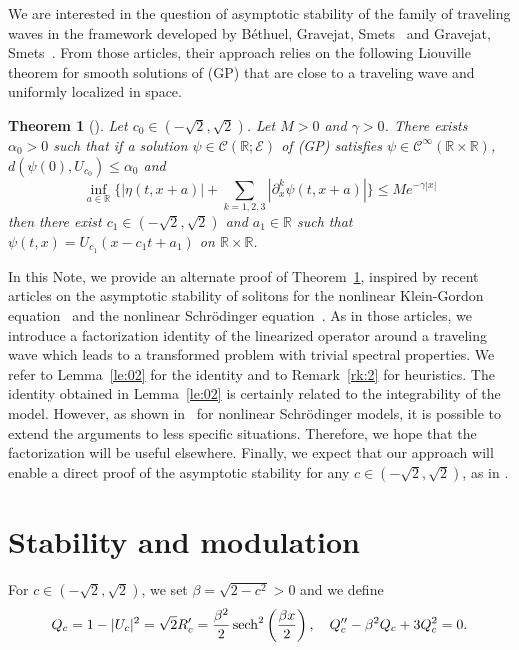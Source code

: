 \documentclass[11pt]{amsart}
\newtheorem{theorem}{Theorem}
\theoremstyle{remark}
\newcommand\RR{\mathbb{R}}
\newcommand\cC{\mathcal{C}}
\newcommand\cE{\mathcal{E}}
\begin{document}
We are interested in the question of asymptotic stability of the family of traveling waves in the framework developed 
by Béthuel, Gravejat, Smets~\cite{BGS1} and Gravejat, Smets~\cite{GS15}.
From those articles, their approach relies on the following Liouville theorem for smooth solutions of (GP) that are close 
to a traveling wave and uniformly localized in space.

\begin{theorem}[\cite{BGS1,GS15}]\label{th:1}
Let $c_0\in (-\sqrt{2}, \sqrt{2})$. Let $M>0$ and $\gamma>0$.
There exists $\alpha_0>0$ such that if
a solution $\psi\in \cC(\RR;\cE)$ of \textnormal{(GP)}
satisfies $\psi\in\cC^\infty(\RR\times\RR)$, $d(\psi(0),U_{c_0})\leq \alpha_0$ and
\[
\inf_{a\in \RR} \biggl\{ |\eta(t, x+a)|
+\sum_{k=1,2,3} |\partial_x^k \psi(t, x+a)|\biggr\}\leq M e^{-\gamma|x|}
\]
then there exist $c_1\in (-\sqrt{2},\sqrt{2})$ and $a_1\in\RR$ such that
$\psi(t,x)=U_{c_1}(x-c_1 t+a_1)$ on $\RR\times\RR$. 
\end{theorem}
In this Note, we provide an alternate proof of Theorem~\ref{th:1},
inspired by recent articles on the asymptotic stability of solitons for
the nonlinear Klein-Gordon equation~\cite{KoMM} and the nonlinear Schrödinger equation~\cite{Ma22}.
As in those articles, we introduce a factorization identity of the linearized operator
around a traveling wave which leads to a transformed problem
with trivial spectral properties. 
We refer to Lemma~\ref{le:02} for the identity and to Remark~\ref{rk:2}
for heuristics.
The identity obtained in Lemma~\ref{le:02} is certainly related to the integrability of the model.
However, as shown in~\cite{Ma22,Ri24} for nonlinear Schrödinger models, 
it is possible to extend the arguments to less specific situations.
Therefore, we hope that the factorization will be useful elsewhere. 
Finally, we expect that our approach will enable a direct 
proof of the asymptotic stability for any $c\in (-\sqrt{2},\sqrt{2})$, as in 
\cite{KoMM,KoMa,Ma22}.

\section{Stability and modulation}

For $c\in (-\sqrt{2},\sqrt{2})$, we set
$\beta=\sqrt{2-c^2}>0$ and we define
\[
Q_c=1-|U_c|^2 =\sqrt{2} R_c'=\frac{\beta^2}2 \sech^2\left(\frac{\beta x}2\right),
\quad Q_c''-\beta^2 Q_c +3Q_c^2=0.
\]

\end{document}
